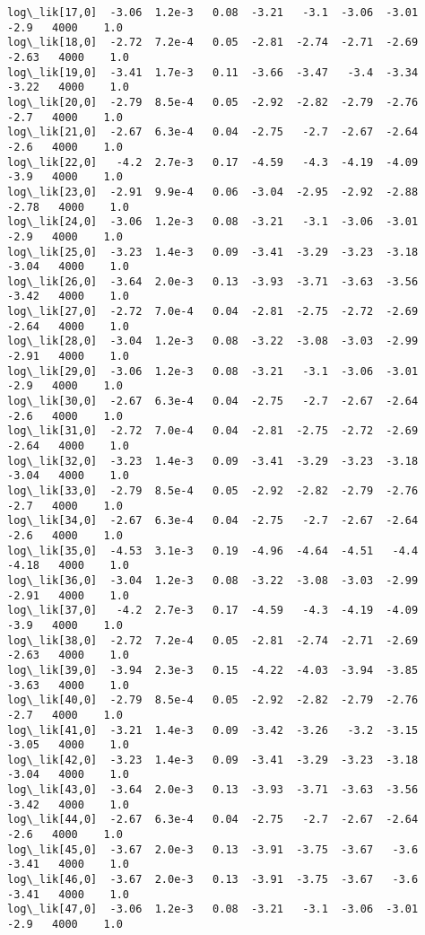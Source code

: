 \documentclass[11pt]{article}
\begin{document}
\begin{Verbatim}[commandchars=\\\{\}]
log\_lik[17,0]  -3.06  1.2e-3   0.08  -3.21   -3.1  -3.06  -3.01   -2.9   4000    1.0
log\_lik[18,0]  -2.72  7.2e-4   0.05  -2.81  -2.74  -2.71  -2.69  -2.63   4000    1.0
log\_lik[19,0]  -3.41  1.7e-3   0.11  -3.66  -3.47   -3.4  -3.34  -3.22   4000    1.0
log\_lik[20,0]  -2.79  8.5e-4   0.05  -2.92  -2.82  -2.79  -2.76   -2.7   4000    1.0
log\_lik[21,0]  -2.67  6.3e-4   0.04  -2.75   -2.7  -2.67  -2.64   -2.6   4000    1.0
log\_lik[22,0]   -4.2  2.7e-3   0.17  -4.59   -4.3  -4.19  -4.09   -3.9   4000    1.0
log\_lik[23,0]  -2.91  9.9e-4   0.06  -3.04  -2.95  -2.92  -2.88  -2.78   4000    1.0
log\_lik[24,0]  -3.06  1.2e-3   0.08  -3.21   -3.1  -3.06  -3.01   -2.9   4000    1.0
log\_lik[25,0]  -3.23  1.4e-3   0.09  -3.41  -3.29  -3.23  -3.18  -3.04   4000    1.0
log\_lik[26,0]  -3.64  2.0e-3   0.13  -3.93  -3.71  -3.63  -3.56  -3.42   4000    1.0
log\_lik[27,0]  -2.72  7.0e-4   0.04  -2.81  -2.75  -2.72  -2.69  -2.64   4000    1.0
log\_lik[28,0]  -3.04  1.2e-3   0.08  -3.22  -3.08  -3.03  -2.99  -2.91   4000    1.0
log\_lik[29,0]  -3.06  1.2e-3   0.08  -3.21   -3.1  -3.06  -3.01   -2.9   4000    1.0
log\_lik[30,0]  -2.67  6.3e-4   0.04  -2.75   -2.7  -2.67  -2.64   -2.6   4000    1.0
log\_lik[31,0]  -2.72  7.0e-4   0.04  -2.81  -2.75  -2.72  -2.69  -2.64   4000    1.0
log\_lik[32,0]  -3.23  1.4e-3   0.09  -3.41  -3.29  -3.23  -3.18  -3.04   4000    1.0
log\_lik[33,0]  -2.79  8.5e-4   0.05  -2.92  -2.82  -2.79  -2.76   -2.7   4000    1.0
log\_lik[34,0]  -2.67  6.3e-4   0.04  -2.75   -2.7  -2.67  -2.64   -2.6   4000    1.0
log\_lik[35,0]  -4.53  3.1e-3   0.19  -4.96  -4.64  -4.51   -4.4  -4.18   4000    1.0
log\_lik[36,0]  -3.04  1.2e-3   0.08  -3.22  -3.08  -3.03  -2.99  -2.91   4000    1.0
log\_lik[37,0]   -4.2  2.7e-3   0.17  -4.59   -4.3  -4.19  -4.09   -3.9   4000    1.0
log\_lik[38,0]  -2.72  7.2e-4   0.05  -2.81  -2.74  -2.71  -2.69  -2.63   4000    1.0
log\_lik[39,0]  -3.94  2.3e-3   0.15  -4.22  -4.03  -3.94  -3.85  -3.63   4000    1.0
log\_lik[40,0]  -2.79  8.5e-4   0.05  -2.92  -2.82  -2.79  -2.76   -2.7   4000    1.0
log\_lik[41,0]  -3.21  1.4e-3   0.09  -3.42  -3.26   -3.2  -3.15  -3.05   4000    1.0
log\_lik[42,0]  -3.23  1.4e-3   0.09  -3.41  -3.29  -3.23  -3.18  -3.04   4000    1.0
log\_lik[43,0]  -3.64  2.0e-3   0.13  -3.93  -3.71  -3.63  -3.56  -3.42   4000    1.0
log\_lik[44,0]  -2.67  6.3e-4   0.04  -2.75   -2.7  -2.67  -2.64   -2.6   4000    1.0
log\_lik[45,0]  -3.67  2.0e-3   0.13  -3.91  -3.75  -3.67   -3.6  -3.41   4000    1.0
log\_lik[46,0]  -3.67  2.0e-3   0.13  -3.91  -3.75  -3.67   -3.6  -3.41   4000    1.0
log\_lik[47,0]  -3.06  1.2e-3   0.08  -3.21   -3.1  -3.06  -3.01   -2.9   4000    1.0

\end{Verbatim}
\end{document}
